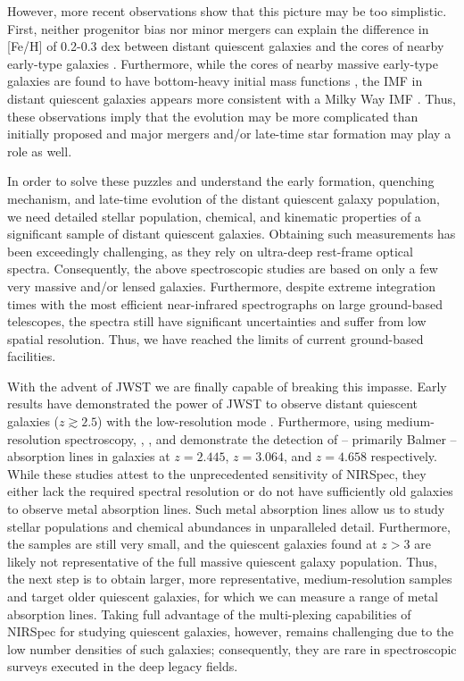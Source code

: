 \documentclass[twocolumn, astrosymb]{aastex631}
\begin{document}
However, more recent observations show that this picture may be too simplistic. First, neither progenitor bias nor minor mergers can explain the difference in [Fe/H] of 0.2-0.3 dex between distant quiescent galaxies and the cores of nearby early-type galaxies \citep{MKriek2016,MKriek2019,ACarnall2022,MGu2022,ZZhuang2023,ABeverage2024}.  Furthermore, while the cores of nearby massive early-type galaxies are found to have bottom-heavy initial mass functions \citep[IMFs,][]{TTreu2010,CConroy2012d}, the IMF in distant quiescent galaxies appears more consistent with a Milky Way \citep[i.e.,][]{PKroupa2001,GChabrier2003} IMF \citep{JMendel2020,BForrest2022,MKriek2023}. Thus, these observations imply that the evolution may be more complicated than initially proposed and major mergers and/or late-time star formation may play a role as well. 

In order to solve these puzzles and understand the early formation, quenching mechanism, and late-time evolution of the distant quiescent galaxy population, we need detailed stellar population, chemical, and kinematic properties of a significant sample of distant quiescent galaxies. Obtaining such measurements has been exceedingly challenging, as they rely on ultra-deep rest-frame optical spectra. Consequently, the above spectroscopic studies are based on only a few very massive and/or lensed galaxies. Furthermore, despite extreme integration times with the most efficient near-infrared spectrographs on large ground-based telescopes, the spectra still have significant uncertainties and suffer from low spatial resolution. Thus, we have reached the limits of current ground-based facilities. 

With the advent of JWST we are finally capable of breaking this impasse. Early results have demonstrated the power of JWST to observe distant quiescent galaxies ($z\gtrsim2.5$) with the low-resolution mode \citep[][]{KGlazebrook2023,DMarchesini2023,TNanayakkara2024,DSetton2024,AdeGraaff2024}. Furthermore, using medium-resolution spectroscopy, \citet{SBelli2023}, \citet{FDEugenio2023}, and \cite{ACarnall2023a} demonstrate the detection of -- primarily Balmer -- absorption lines in galaxies at $z=2.445$, $z=3.064$, and $z=4.658$ respectively. While these studies attest to the unprecedented sensitivity of NIRSpec, they either lack the required spectral resolution or do not have sufficiently old galaxies to observe metal absorption lines. Such metal absorption lines allow us to study stellar populations and chemical abundances in unparalleled detail. Furthermore, the samples are still very small, and the quiescent galaxies found at $z>3$ are likely not representative of the full massive quiescent galaxy population. Thus, the next step is to obtain larger, more representative, medium-resolution samples and target older quiescent galaxies, for which we can measure a range of metal absorption lines. Taking full advantage of the multi-plexing capabilities of NIRSpec \citep{PFerruit2022} for studying quiescent galaxies, however, remains challenging due to the low number densities of such galaxies; consequently, they are rare in spectroscopic surveys executed in the deep legacy fields.
\end{document}
